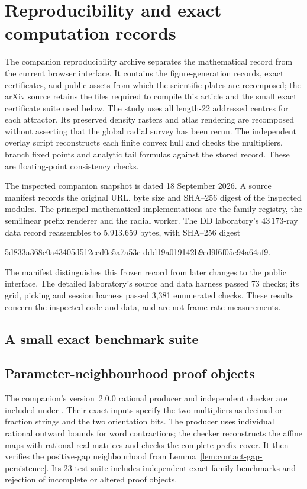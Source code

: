 \section{Reproducibility and exact computation records}
\label{app:reproducibility}

The companion reproducibility archive separates the mathematical record from the
current browser interface. It contains the figure-generation records, exact
certificates, and public assets from which the scientific plates are recomposed;
the arXiv source retains the files required to compile this article and the
small exact certificate suite used below. The study uses all length-22 addressed centres
for each attractor. Its preserved density rasters and atlas rendering are
recomposed without asserting that the global radial survey has been rerun.
The independent overlay script reconstructs each finite convex hull and checks
the multipliers, branch fixed points and analytic tail formulas against the
stored record. These are floating-point consistency checks.

The inspected companion snapshot is dated 18 September 2026. A source manifest
records the original URL, byte size and SHA--256 digest of the inspected
modules. The principal mathematical implementations are the family registry,
the semilinear prefix renderer and the radial worker. The DD laboratory's
$43\,173$-ray data record reassembles to 5,913,659 bytes, with SHA--256 digest
\begin{center}\footnotesize\ttfamily
5d833a368c0a43405d512ecd0e5a7a53c\linebreak
ddd19a019142b9ed9f6f05e94a64af9.
\end{center}
The manifest distinguishes this frozen record from later changes to the public
interface. The detailed laboratory's source and data harness passed 73 checks;
its grid, picking and session harness passed 3,381 enumerated checks. These
results concern the inspected code and data, and are not frame-rate measurements.

\subsection{A small exact benchmark suite}


\subsection{Parameter-neighbourhood proof objects}
The companion's version~2.0.0 rational producer and independent checker are
included under . Their exact inputs specify the
two multipliers as decimal or fraction strings and the two orientation bits.
The producer uses individual rational outward bounds for word contractions;
the checker reconstructs the affine maps with rational real matrices and checks
the complete prefix cover. It then verifies the positive-gap neighbourhood from
Lemma~\ref{lem:contact-gap-persistence}. Its 23-test suite includes independent
exact-family benchmarks and rejection of incomplete or altered proof objects.

